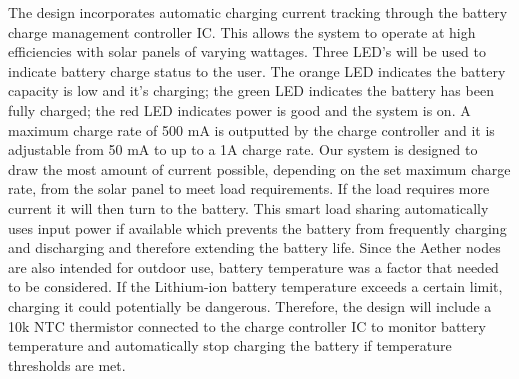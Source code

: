 The design incorporates automatic charging current tracking through the battery charge management controller IC. This allows the system to operate at high efficiencies with solar panels of varying wattages. Three LED's will be used to indicate battery charge status to the user. The orange LED indicates the battery capacity is low and it’s charging; the green LED indicates the battery has been fully charged; the red LED indicates power is good and the system is on. A maximum charge rate of 500 mA is outputted by the charge controller and it is adjustable from 50 mA to up to a 1A charge rate. Our system is designed to draw the most amount of current possible, depending on the set maximum charge rate, from the solar panel to meet load requirements. If the load requires more current it will then turn to the battery. This smart load sharing automatically uses input power if available which prevents the battery from frequently charging and discharging and therefore extending the battery life. Since the Aether nodes are also intended for outdoor use, battery temperature was a factor that needed to be considered. If the Lithium-ion battery temperature exceeds a certain limit, charging it could potentially be dangerous. Therefore, the design will include a 10k NTC thermistor connected to the charge controller IC to monitor battery temperature and automatically stop charging the battery if temperature thresholds are met. 

